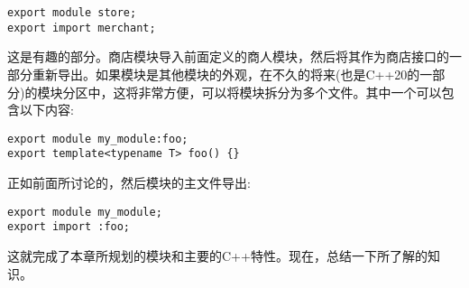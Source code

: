 \begin{lstlisting}[style=styleCXX]
export module store;
export import merchant;
\end{lstlisting}

这是有趣的部分。商店模块导入前面定义的商人模块，然后将其作为商店接口的一部分重新导出。如果模块是其他模块的外观，在不久的将来(也是C++20的一部分)的模块分区中，这将非常方便，可以将模块拆分为多个文件。其中一个可以包含以下内容:

\begin{lstlisting}[style=styleCXX]
export module my_module:foo;
export template<typename T> foo() {}
\end{lstlisting}

正如前面所讨论的，然后模块的主文件导出:

\begin{lstlisting}[style=styleCXX]
export module my_module;
export import :foo;
\end{lstlisting}

这就完成了本章所规划的模块和主要的C++特性。现在，总结一下所了解的知识。






